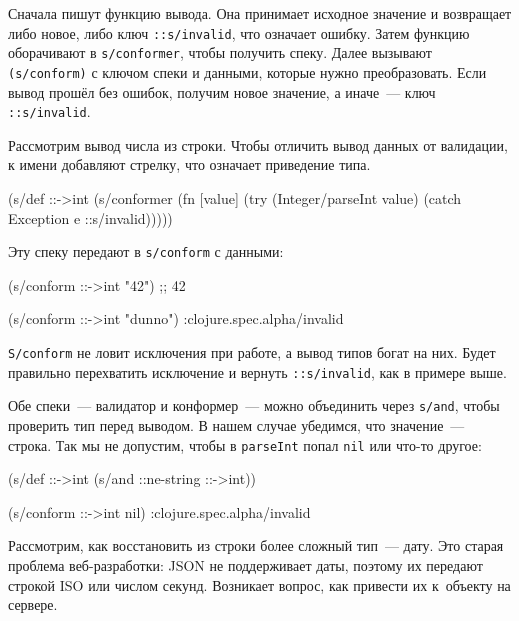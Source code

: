Сначала пишут функцию вывода. Она принимает исходное значение и возвращает либо
новое, либо ключ \verb|::s/invalid|, что означает ошибку. Затем функцию
оборачивают в \verb|s/conformer|, чтобы получить спеку. Далее вызывают
\verb|(s/conform)| с ключом спеки и данными, которые нужно преобразовать. Если
вывод прошёл без ошибок, получим новое значение, а иначе~--- ключ
\verb|::s/invalid|.

Рассмотрим вывод числа из строки. Чтобы отличить вывод данных от валидации, к
имени добавляют стрелку, что означает приведение типа.

\begin{english}
  \begin{clojure}
(s/def ::->int
  (s/conformer
   (fn [value]
     (try
       (Integer/parseInt value)
       (catch Exception e
         ::s/invalid)))))
  \end{clojure}
\end{english}

\noindent
Эту спеку передают в \verb|s/conform| с данными:

\begin{english}
  \begin{clojure}
(s/conform ::->int "42") ;; 42

(s/conform ::->int "dunno")
:clojure.spec.alpha/invalid
  \end{clojure}
\end{english}


\verb|S/conform| не ловит исключения при работе, а вывод типов богат на
них. Будет правильно перехватить исключение и вернуть \verb|::s/invalid|, как
в примере выше.

Обе спеки~--- валидатор и конформер~--- можно объединить через \verb|s/and|,
чтобы проверить тип перед выводом. В нашем случае убедимся, что значение~---
строка. Так мы не допустим, чтобы в \verb|parseInt| попал \verb|nil| или
что-то другое:

\begin{english}
  \begin{clojure}
(s/def ::->int
  (s/and ::ne-string ::->int))

(s/conform ::->int nil)
:clojure.spec.alpha/invalid
  \end{clojure}
\end{english}


Рассмотрим, как восстановить из строки более сложный тип~--- дату. Это старая
проблема веб-разработки: JSON не поддерживает даты, поэтому их передают строкой
ISO или числом секунд. Возникает вопрос, как привести их к~объекту на сервере.

